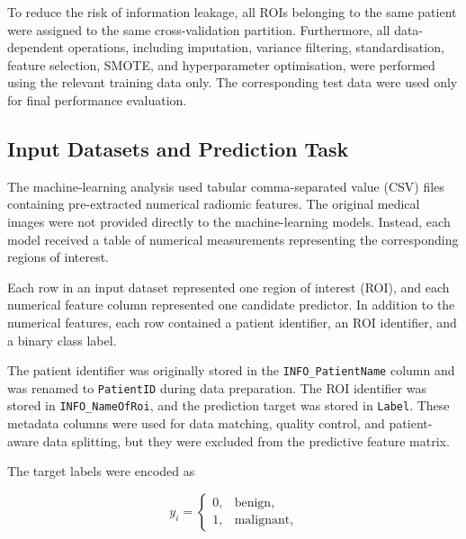 \documentclass[12pt,twocolumn]{article}
\begin{document}
To reduce the risk of information leakage, all ROIs belonging to the
same patient were assigned to the same cross-validation partition.
Furthermore, all data-dependent operations, including imputation,
variance filtering, standardisation, feature selection, SMOTE, and
hyperparameter optimisation, were performed using the relevant
training data only. The corresponding test data were used only for
final performance evaluation.
















\subsection{Input Datasets and Prediction Task}
\label{subsec:input_datasets}

The machine-learning analysis used tabular comma-separated value
(CSV) files containing pre-extracted numerical radiomic features.
The original medical images were not provided directly to the
machine-learning models. Instead, each model received a table of
numerical measurements representing the corresponding regions of
interest.

Each row in an input dataset represented one region of interest
(ROI), and each numerical feature column represented one candidate
predictor. In addition to the numerical features, each row contained
a patient identifier, an ROI identifier, and a binary class label.

The patient identifier was originally stored in the
\texttt{INFO\_PatientName} column and was renamed to
\texttt{PatientID} during data preparation. The ROI identifier was
stored in \texttt{INFO\_NameOfRoi}, and the prediction target was
stored in \texttt{Label}. These metadata columns were used for data
matching, quality control, and patient-aware data splitting, but they
were excluded from the predictive feature matrix.

The target labels were encoded as

\begin{equation}
y_i =
\begin{cases}
0, & \text{benign},\\
1, & \text{malignant},
\end{cases}
\label{eq:class_encoding}
\end{equation}
\end{document}
